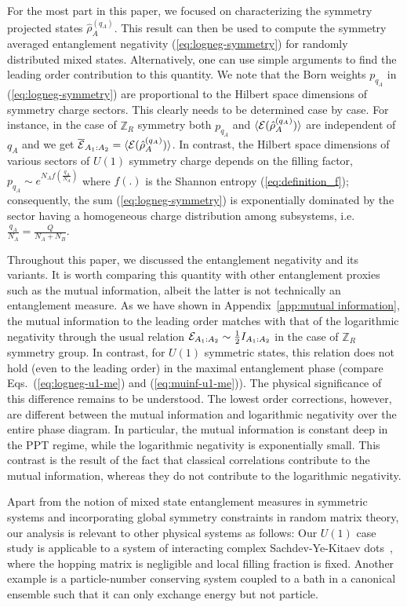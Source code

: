 \documentclass[aps,pra,reprint,superscriptaddress,twocolumn,notitlepage]{revtex4-1}
\newcommand{\Z}{\mathbb{Z}}
\numberwithin{equation}{section}
\begin{document}
For the most part in this paper, we focused on characterizing the symmetry projected states $\hat\rho_A^{(q_A)}$. This result can then be used to compute the symmetry averaged entanglement negativity (\ref{eq:logneg-symmetry}) for randomly distributed  mixed states. Alternatively, one can use simple arguments to find the leading order contribution to this quantity.  We note that the Born weights $p_{q_A}$ in (\ref{eq:logneg-symmetry}) are proportional to the Hilbert space dimensions of symmetry charge sectors. This clearly needs to be determined case by case. For instance, in the case of $\Z_R$ symmetry both $p_{q_A}$ and $\braket{{\cal E}(\hat \rho_A^{(q_A)})}$ are independent of $q_A$ and we get $\overline{\cal E}_{A_1:A_2} = \braket{{\cal E}(\hat \rho_A^{(q_A)})}$. In contrast, the Hilbert space dimensions of various sectors of $U(1)$ symmetry charge depends on the filling factor, $p_{q_A}\sim e^{N_A f(\frac{q_A}{N_A})}$ where $f(.)$ is the Shannon entropy (\ref{eq:definition_f}); consequently, the sum (\ref{eq:logneg-symmetry}) is exponentially dominated by the sector having a homogeneous charge distribution among subsystems, i.e.~$\frac{q_A}{N_A} = \frac{Q}{N_A+N_B}$.


Throughout this paper, we discussed the entanglement negativity and its variants. It is worth comparing this quantity with other entanglement proxies such as the mutual information, albeit the latter is not technically an entanglement measure. As we have shown in Appendix~\ref{app:mutual information}, the mutual information to the leading order matches with that of the logarithmic  negativity through the usual relation ${\cal E}_{A_1:A_2} \sim \frac{1}{2} I_{A_1:A_2}$ in the case of $\Z_R$ symmetry group. In contrast, for $U(1)$ symmetric states, this relation does not hold (even to the leading order) in the maximal entanglement phase (compare Eqs.~(\ref{eq:logneg-u1-me}) and (\ref{eq:muinf-u1-me})). The physical significance of this difference remains to be understood. The lowest order corrections, however, are different between the mutual information and logarithmic negativity over the entire phase diagram. In particular, the mutual information is constant deep in the PPT regime, while the logarithmic negativity is exponentially small. This contrast is the result of the fact that classical correlations contribute to the mutual information, whereas they do not contribute to the logarithmic negativity.

Apart from the notion of mixed state entanglement measures in symmetric systems and incorporating global symmetry constraints in random matrix theory, our analysis is relevant to other physical systems as follows: Our $U(1)$ case study is applicable to a system of interacting 
complex Sachdev-Ye-Kitaev dots~\cite{Kitaev-talk,Gu2020}, where the hopping matrix is negligible and local filling fraction is fixed. Another example is a particle-number conserving system coupled to a bath in a canonical ensemble such that it can only exchange energy but not particle.
\end{document}
